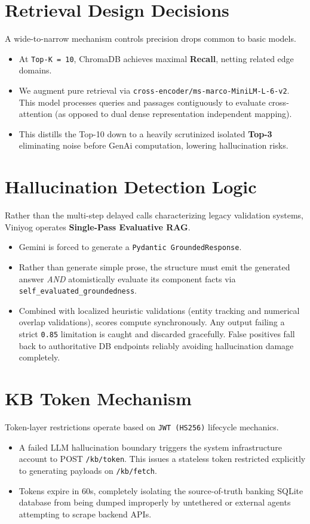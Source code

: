\documentclass[11pt,a4paper]{article}
\begin{document}
\section{Retrieval Design Decisions}
A wide-to-narrow mechanism controls precision drops common to basic models.
\begin{itemize}
    \item At \texttt{Top-K = 10}, ChromaDB achieves maximal \textbf{Recall}, netting related edge domains.
    \item We augment pure retrieval via \texttt{cross-encoder/ms-marco-MiniLM-L-6-v2}. This model processes queries and passages contiguously to evaluate cross-attention (as opposed to dual dense representation independent mapping).
    \item This distills the Top-10 down to a heavily scrutinized isolated \textbf{Top-3} eliminating noise before GenAi computation, lowering hallucination risks.
\end{itemize}

\section{Hallucination Detection Logic}
Rather than the multi-step delayed calls characterizing legacy validation systems, Viniyog operates \textbf{Single-Pass Evaluative RAG}.

\begin{itemize}
    \item Gemini is forced to generate a \texttt{Pydantic GroundedResponse}.
    \item Rather than generate simple prose, the structure must emit the generated answer \textit{AND} atomistically evaluate its component facts via \texttt{self\_evaluated\_groundedness}.
    \item Combined with localized heuristic validations (entity tracking and numerical overlap validations), scores compute synchronously. Any output failing a strict \texttt{0.85} limitation is caught and discarded gracefully. False positives fall back to authoritative DB endpoints reliably avoiding hallucination damage completely.
\end{itemize}

\section{KB Token Mechanism}
Token-layer restrictions operate based on \texttt{JWT (HS256)} lifecycle mechanics.
\begin{itemize}
    \item A failed LLM hallucination boundary triggers the system infrastructure account to POST \texttt{/kb/token}. This issues a stateless token restricted explicitly to generating payloads on \texttt{/kb/fetch}.
    \item Tokens expire in 60s, completely isolating the source-of-truth banking SQLite database from being dumped improperly by untethered or external agents attempting to scrape backend APIs.
\end{itemize}
\end{document}
